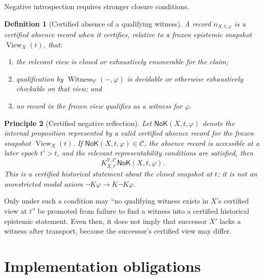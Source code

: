 \documentclass[11pt]{article}
\newtheorem{definition}{Definition}[section]
\newtheorem{principle}[definition]{Principle}
\theoremstyle{remark}
\newcommand{\View}{\operatorname{View}}
\newcommand{\Witness}{\operatorname{Witness}}
\newcommand{\K}[4]{K^{#3,#4}_{#1,#2}}
\begin{document}
Negative introspection requires stronger closure conditions.

\begin{definition}[Certified absence of a qualifying witness]
A record $n_{X,t,\varphi}$ is a \emph{certified absence record} when it certifies, relative to a frozen epistemic snapshot $\View_X(t)$, that:
\begin{enumerate}[label=(\alph*)]
\item the relevant view is closed or exhaustively enumerable for the claim;
\item qualification by $\Witness_{\mathcal V}(-,\varphi)$ is decidable or otherwise exhaustively checkable on that view; and
\item no record in the frozen view qualifies as a witness for $\varphi$.
\end{enumerate}
\end{definition}

\begin{principle}[Certified negative reflection]
Let $\mathsf{NoK}(X,t,\varphi)$ denote the internal proposition represented by a valid certified absence record for the frozen snapshot $\View_X(t)$. If $\mathsf{NoK}(X,t,\varphi)\in\mathcal C$, the absence record is accessible at a later epoch $t'>t$, and the relevant representability conditions are satisfied, then
\[
\K{X}{t'}{\mathcal V}{\mathcal C}\mathsf{NoK}(X,t,\varphi).
\]
This is a certified historical statement about the closed snapshot at $t$; it is not an unrestricted modal axiom $\neg K\varphi\to K\neg K\varphi$.
\end{principle}

Only under such a condition may ``no qualifying witness exists in $X$'s certified view at $t$'' be promoted from failure to find a witness into a certified historical epistemic statement. Even then, it does not imply that successor $X'$ lacks a witness after transport, because the successor's certified view may differ.

\section{Implementation obligations}
\end{document}
